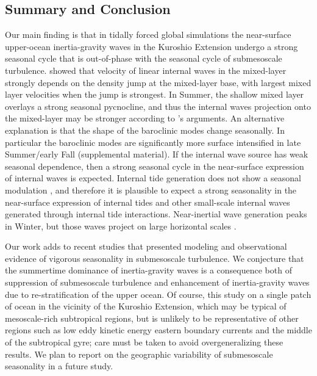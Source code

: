 \documentclass[grl]{agutex2015}
\begin{document}
\begin{article}
\section{Summary and Conclusion}
Our main finding is that in tidally forced global simulations the
near-surface upper-ocean inertia-gravity waves in the Kuroshio Extension undergo
a strong seasonal cycle that is out-of-phase with the seasonal cycle of
submesoscale turbulence. \cite{dasaro1978} showed that velocity of linear internal waves
in the mixed-layer strongly depends on the density jump at the mixed-layer
base, with largest mixed layer velocities when the jump is strongest.
In Summer, the shallow mixed layer overlays a strong seasonal pycnocline,
and thus the internal waves projection onto the mixed-layer may be stronger
according to \cite{dasaro1978}'s arguments. An
alternative explanation is that the shape of the baroclinic modes
change seasonally. In particular the baroclinic modes are
significantly more surface intensified in late Summer/early Fall
 (supplemental material).
If the internal wave source has weak seasonal dependence, then a strong
seasonal cycle in the near-surface expression of internal waves is expected.
Internal tide generation does not show a seasonal modulation \citep[e.g.,][]{alford2003},
and therefore it is plausible to expect a strong seasonality in the near-surface
expression of internal tides and
other small-scale internal waves generated through internal tide interactions.
Near-inertial wave generation peaks in Winter, but those waves project on large
horizontal scales \citep[e.g, ][]{qi_etal1995}.

Our work adds to recent studies that presented modeling \cite{sasaki_etal2014}
and observational \citep{callies_etal2015,buckingham_etal2016} evidence of vigorous seasonality in
submesoscale turbulence. We conjecture that the summertime dominance of inertia-gravity waves
 \citep{callies_etal2015} is a consequence both of suppression of submesoscale turbulence and
enhancement of inertia-gravity waves due to re-stratification of
the upper ocean. Of course, this study on a single patch of ocean in the
vicinity of the Kuroshio Extension, which may be typical of mesoscale-rich
subtropical regions, but is unlikely to be
representative of other regions such as low eddy kinetic energy eastern boundary currents
and the middle of the subtropical gyre; care must be taken to avoid overgeneralizing
these results.  We plan to report on the geographic variability of submesoscale
 seasonality in a future study.


\end{article}
\end{document}
